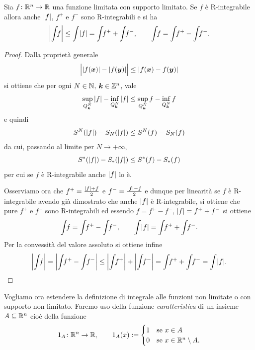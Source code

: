 \begin{theorem}
Sia $f\colon {\mathbb R}^n \to {\mathbb R}$ una funzione limitata con supporto limitato.
Se $f$ è R-integrabile allora anche ${\left|f\right|}$, $f^+$ e $f^-$ sono 
R-integrabili e si ha 
\[
  \abs{\int\!\! f} \le \int\! \abs f = \int\!\! f^+ + \int\!\! f^-, 
  \qquad 
 \int\!\! f = \int\!\! f^+ - \int\!\! f^-.
\]
\end{theorem}
\begin{proof}
Dalla proprietà generale 
\[
  \abs{\rule{0pt}{1.1em}\abs{f(\vec x)} - \abs{f(\vec y)}} \le \abs{f(\vec x) - f(\vec y)}
\]
si ottiene che per ogni $N\in {\mathbb N}$, $\boldsymbol k \in {\mathbb Z}^n$, vale
\[
  \sup_{Q^N_{\boldsymbol k}} {\left|f\right|} - \inf_{Q^N_{\boldsymbol k}} {\left|f\right|}
  \le 
  \sup_{Q^N_{\boldsymbol k}} f - \inf_{Q^N_{\boldsymbol k}} f
\]
e quindi 
\[
   S^N({\left|f\right|}) - S_N({\left|f\right|}) \le S^N(f) - S_N(f)
\] 
da cui, passando al limite per $N\to +\infty$,
\[
  S^*({\left|f\right|}) - S_*({\left|f\right|}) \le S^*(f) - S_*(f)
\]
per cui se $f$ è R-integrabile anche ${\left|f\right|}$ lo è.

Osserviamo ora che $f^+=\frac{{\left|f\right|} + f}{2}$ e $f^-=\frac{{\left|f\right|} - f}{2}$ 
e dunque per linearità se $f$ è R-integrabile avendo già dimostrato 
che anche ${\left|f\right|}$ è R-integrabile, si ottiene che pure $f^+
$ e $f^-$ sono R-integrabili ed essendo $f=f^+-f^-$, ${\left|f\right|} = f^+ + f^-$ si ottiene 
\[
  \int\!\! f = \int\!\! f^+ - \int\!\! f^-, \qquad 
  \int\! \abs f = \int\!\! f^+ + \int\!\! f^-.
\]
Per la convessità del valore assoluto si ottiene infine
\[
 \abs{\int\!\! f} = \abs{\int\!\! f^+ - \int\!\! f^-} 
 \le \abs {\int\!\! f^+} + \abs{\int\!\! f^-}
 = \int\!\! f^+ + \int\!\! f^- = \int\! \abs f.
\]
\end{proof}

Vogliamo ora estendere la definizione di integrale 
alle funzioni non limitate o con supporto non limitato.
Faremo uso della funzione \emph{caratteristica}
di un insieme $A\subseteq {\mathbb R}^n$ cioè della funzione 
\[
  1_A \colon {\mathbb R}^n \to {\mathbb R}, 
  \qquad 
  1_A(x) := \begin{cases}
    1 & \text{se } x\in A\\
    0 & \text{se } x\in {\mathbb R}^n\setminus A.
  \end{cases}
\]

